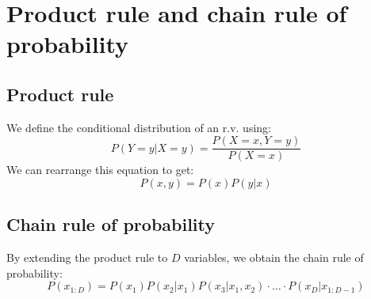 \section{Product rule and chain rule of probability}
\subsection*{Product rule}
\par 
We define the conditional distribution of an r.v. using:
\[
    P(Y = y | X = y) = \dfrac{P(X = x, Y = y)}{P(X = x)}
\]
We can rearrange this equation to get:
\[
    P(x,y) = P(x)P(y|x)  
\]
\subsection*{Chain rule of probability}
\par 
By extending the product rule to $D$ variables, we obtain the chain rule of probability:
\[
    P(x_{1:D}) = P(x_1)P(x_2 | x_1) P(x_3 | x_1, x_2) \cdot \ldots \cdot P(x_D| x_{1:D-1})  
\]